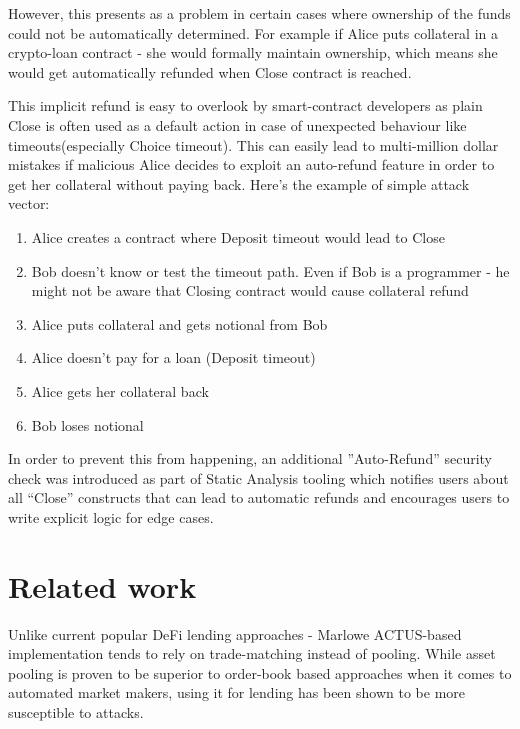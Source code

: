 \documentclass[runningheads]{llncs}
\begin{document}
However, this presents as a problem in certain cases where ownership
of the funds could not be automatically determined. For example if
Alice puts collateral in a crypto-loan contract - she would formally
maintain ownership, which means she would get automatically refunded
when Close contract is reached.

This implicit refund is easy to overlook by smart-contract developers
as plain Close is often used as a default action in case of unexpected
behaviour like timeouts(especially Choice timeout). This can easily
lead to multi-million dollar mistakes if malicious Alice decides to
exploit an auto-refund feature in order to get her collateral without
paying back. Here's the example of simple attack vector: 
\begin{enumerate}
\item Alice creates a contract where Deposit timeout would lead to Close 
\item Bob doesn't know or test the timeout path. Even if Bob is a programmer
- he might not be aware that Closing contract would cause collateral
refund 
\item Alice puts collateral and gets notional from Bob 
\item Alice doesn't pay for a loan (Deposit timeout) 
\item Alice gets her collateral back 
\item Bob loses notional 
\end{enumerate}
In order to prevent this from happening, an additional ''Auto-Refund''
security check was introduced as part of Static Analysis tooling which
notifies users about all ``Close'' constructs that can lead to automatic
refunds and encourages users to write explicit logic for edge cases.

\section{Related work}\label{related}



Unlike current popular DeFi lending approaches - Marlowe ACTUS-based
implementation tends to rely on trade-matching instead of pooling.
While asset pooling is proven to be superior to order-book based approaches
when it comes to automated market makers, using it for lending has
been shown to be more susceptible to attacks\cite{flash-loan}.
\end{document}

